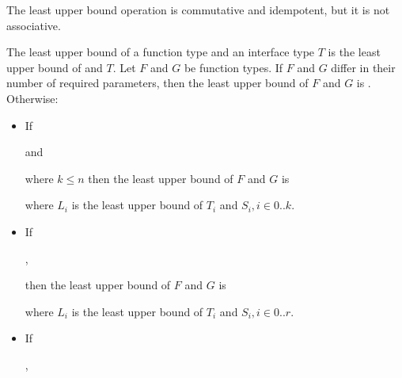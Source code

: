 \documentclass[makeidx]{article}
\begin{document}
{\LMHash{}%
The least upper bound operation is commutative and idempotent,
but it is not associative.



\LMHash{}%
The least upper bound of a function type and an interface type $T$ is the least upper bound of \FUNCTION{} and $T$.
Let $F$ and $G$ be function types.
If $F$ and $G$ differ in their number of required parameters,
then the least upper bound of $F$ and $G$ is \FUNCTION{}.
Otherwise:
\begin{itemize}
\item If

 and


\noindent
where $k \le n$ then the least upper bound of $F$ and $G$ is


\noindent
where $L_i$ is the least upper bound of $T_i$ and $S_i, i \in 0 .. k$.
\item If

,


\noindent
then the least upper bound of $F$ and $G$ is


\noindent
where $L_i$ is the least upper bound of $T_i$ and $S_i, i \in 0 .. r$.
\item If

,



\end{itemize}}
\end{document}
